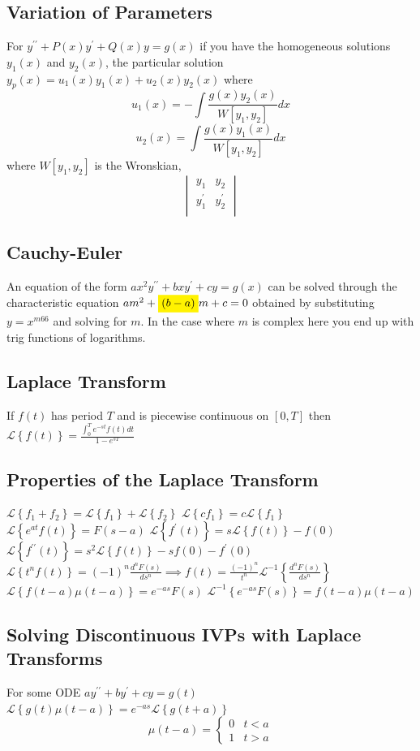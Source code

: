 \documentclass[10pt,landscape,letterpaper]{cheatsheet}
\newcommand{\laplace}[1]{\mathcal{L}\left\{#1\right\}}
\newcommand{\laplacei}[1]{\mathcal{L}^{-1}\left\{#1\right\}}
\newcommand{\highlight}[1]{\colorbox{yellow}{$\displaystyle #1$}}
\begin{document}
\subsection*{Variation of Parameters}
For $y^{\prime\prime}+P(x)y^{\prime}+Q(x)y=g(x)$ if you have the homogeneous solutions $y_1(x)$ and $y_2(x)$, the particular solution $y_p(x)=u_1(x)y_1(x)+u_2(x)y_2(x)$ where
$$u_1(x)=-\int\frac{g(x)y_2(x)}{W\left[y_1, y_2\right]}dx$$
$$u_2(x)=\int\frac{g(x)y_1(x)}{W\left[y_1, y_2\right]}dx$$
where $W\left[y_1, y_2\right]$ is the Wronskian,
$$\begin{vmatrix}
                y_1          & y_2          \\
                y_1^{\prime} & y_2^{\prime} \\
        \end{vmatrix}$$
\subsection*{Cauchy-Euler}
An equation of the form $ax^2y^{\prime\prime}+bxy^{\prime}+cy=g(x)$ can be solved through the characteristic equation $am^2+\highlight{(b-a)}m+c=0$ obtained by substituting $y=x^{m66}$ and solving for $m$.
In the case where $m$ is complex here you end up with trig functions of logarithms.
\subsection*{Laplace Transform}
If $f(t)$ has period $T$ and is piecewise continuous on $[0,T]$ then $\laplace{f(t)}=\frac{\int_{0}^{T}e^{-st}f(t)dt}{1-e^{sT}}$
\subsection*{Properties of the Laplace Transform}
$\laplace{f_1+f_2}=\laplace{f_1}+\laplace{f_2}$
$\laplace{cf_1}=c\laplace{f_1}$
$\laplace{e^{at}f(t)}=F(s-a)$
$\laplace{f^\prime(t)}=s\laplace{f(t)}-f(0)$
$\laplace{f^{\prime\prime}(t)}=s^2\laplace{f(t)}-sf(0)-f^\prime(0)$
$\laplace{t^nf(t)}=(-1)^n\frac{d^nF(s)}{ds^n}\implies f(t)=\frac{\left(-1\right)^{n}}{t^n}\laplacei{\frac{d^nF(s)}{ds^n}}$
$\laplace{f(t-a)\mu(t-a)}=e^{-as}F(s)$
$\laplacei{e^{-as}F(s)}=f(t-a)\mu(t-a)$
\subsection*{Solving Discontinuous IVPs with Laplace Transforms}
For some ODE $ay^{\prime\prime}+by^{\prime}+cy=g(t)$ $\laplace{g(t)\mu(t-a)}=e^{-as}\laplace{g(t+a)}$
$$\mu(t-a)=
        \begin{cases}
                0 & t<a \\
                1 & t>a
        \end{cases}
$$
\end{document}
